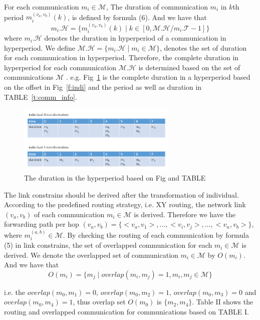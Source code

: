 \documentclass[jornal]{IEEEtran}
\begin{document}
For each communication $m_{i}\in \mathcal{M}$, The duration of communication $m_{i}$ in $\mathit{k}$th period ${m_{i}^{(v_{a},v_{b})}}(k)$, is defined by formula (6). And we have that
\begin{equation}
m_{i}.\mathcal{H} = \{ {m_{i}^{(v_{a},v_{b})}}(k) \mid k \in [0, \mathcal{M.H} / m_{i}.\mathcal{T} - 1] \}
\end{equation}
where $m_{i}.\mathcal{H}$ denotes the duration in hyperperiod of a communication in hyperperiod.
We define $\mathcal{M.H}=\{ m_{i}.\mathcal{H} \mid m_{i}\in \mathcal{M} \}$, denotes the set of duration for each communication in hyperperiod. 
Therefore, the complete duration in hyperperiod for each communication $\mathcal{M.H}$ is determined based on the set of communications $\mathcal{M}$ . e.g. Fig~\ref{f:duration} is the complete duration in a hyperperiod based on the offset in Fig~\ref{f:indi} and the period as well as duration in TABLE~\ref{t:comm_info}.

\begin{figure}[!t]
	\centering
	\includegraphics[width=3in]{picture/individual_transformation.pdf}
	\caption{The duration in the hyperperiod based on Fig and TABLE}
	\label{f:duration}
\end{figure}

The link constrains should be derived after the transformation of individual. According to the predefined routing strategy, i.e. XY routing, the network link $(v_{a},v_{b})$ of each communication $m_{i}\in\mathcal{M}$ is derived. Therefore we have the forwarding path per hop $ (v_{a},v_{b})=\{ <v_{a},v_{1}> ,\dots, <v_{i},v_{j}> ,\dots, <v_{n},v_{b}> \} $, where $m_{i}^{(a,b)}\in\mathcal{M}$. By checking the routing of each communication by formula (5) in link constrains, the set of overlapped communication for each $m_{i}\in\mathcal{M}$ is derived. We denote the overlapped set of communication $m_{i}\in \mathcal{M}$ by $O(m_i)$. And we have that
\begin{equation}
	O(m_i) = \{ m_j \mid overlap(m_i,m_j)=1,m_i,m_j\in\mathcal{M}  \}
\end{equation}

 i.e. the $overlap(m_{0},m_{1})=0$, $overlap(m_{0},m_{2})=1$, $overlap(m_{0},m_{3})=0$ and $overlap(m_{0},m_{4})=1$, thus overlap set $O(m_{0})$ is $\{ m_{2},m_{4} \}$. Table II shows the routing and overlapped communication for communications based on TABLE I.
\end{document}
